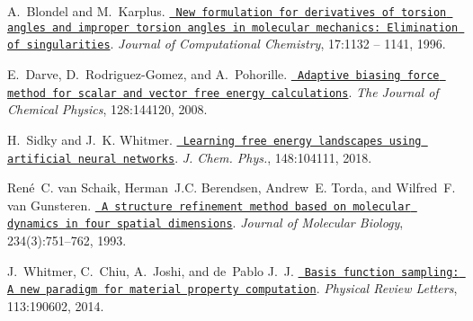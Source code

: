 
\begin{DoxyDescription}
\item[\label{citelist_CITEREF_BLONDEL19961132}%
\Hypertarget{citelist_CITEREF_BLONDEL19961132}%
\mbox{[}1\mbox{]}]A.~Blondel and M.~Karplus. \href{https://onlinelibrary.wiley.com/doi/abs/10.1002/\%28SICI\%291096-987X\%2819960715\%2917\%3A9\%3C1132\%3A\%3AAID-JCC5\%3E3.0.CO\%3B2-T}{\texttt{ New formulation for derivatives of torsion angles and improper torsion angles in molecular mechanics\+: Elimination of singularities}}. {\itshape Journal of Computational Chemistry}, 17\+:1132 -- 1141, 1996. 


\item[\label{citelist_CITEREF_DARVE2008144120}%
\Hypertarget{citelist_CITEREF_DARVE2008144120}%
\mbox{[}2\mbox{]}]E.~Darve, D.~Rodriguez-\/\+Gomez, and A.~Pohorille. \href{https://aip.scitation.org/doi/10.1063/1.2829861}{\texttt{ Adaptive biasing force method for scalar and vector free energy calculations}}. {\itshape The Journal of Chemical Physics}, 128\+:144120, 2008. 


\item[\label{citelist_CITEREF_SIDKY2018104111}%
\Hypertarget{citelist_CITEREF_SIDKY2018104111}%
\mbox{[}3\mbox{]}]H.~Sidky and J.~K. Whitmer. \href{https://aip.scitation.org/doi/10.1063/1.5018708}{\texttt{ Learning free energy landscapes using artificial neural networks}}. {\itshape J. Chem. Phys.}, 148\+:104111, 2018. 


\item[\label{citelist_CITEREF_VANSCHAIK1993751}%
\Hypertarget{citelist_CITEREF_VANSCHAIK1993751}%
\mbox{[}4\mbox{]}]Ren\'{e}~C. van Schaik, Herman~J.\+C. Berendsen, Andrew~E. Torda, and Wilfred~F. van Gunsteren. \href{https://www.sciencedirect.com/science/article/pii/S0022283683716244}{\texttt{ A structure refinement method based on molecular dynamics in four spatial dimensions}}. {\itshape Journal of Molecular Biology}, 234(3)\+:751--762, 1993. 


\item[\label{citelist_CITEREF_WHITMER2014190602}%
\Hypertarget{citelist_CITEREF_WHITMER2014190602}%
\mbox{[}5\mbox{]}]J.~Whitmer, C.~Chiu, A.~Joshi, and de~Pablo J.~J. \href{https://journals.aps.org/prl/abstract/10.1103/PhysRevLett.113.190602}{\texttt{ Basis function sampling\+: A new paradigm for material property computation}}. {\itshape Physical Review Letters}, 113\+:190602, 2014. 


\end{DoxyDescription}